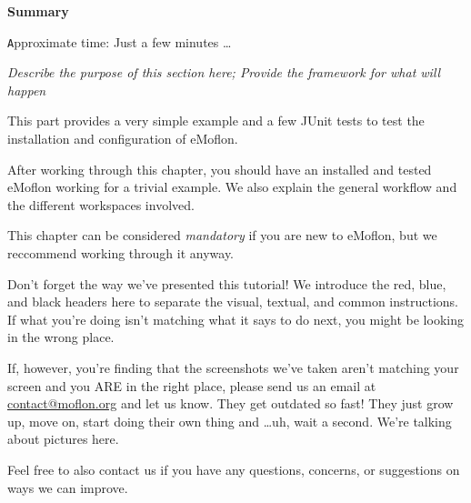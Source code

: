 \vspace*{2cm}

{\Huge \bfseries Summary}
\vspace{0.5cm}

{\small \texttt Approximate time: Just a few minutes \ldots}

\emph{Describe the purpose of this section here; Provide the framework for what will happen}

This part provides a very simple example and a few JUnit tests to test the installation and configuration of eMoflon.

After working through this chapter, you should have an installed and tested eMoflon working for a trivial example.
We also explain the general workflow and the different workspaces involved.

This chapter can be considered \emph{mandatory} if you are new to eMoflon, but we reccommend working through it anyway.

Don't forget the way we've presented this tutorial! We introduce the red, blue, and black headers here to separate the visual, textual, and common instructions. 
If what you're doing isn't matching what it says to do next, you might be looking in the wrong place.

If, however, you're finding that the screenshots we've taken aren't matching your screen and you ARE in the right place, please send us an email at \href{mailto:contact@moflon.org}{contact@moflon.org} and let us know. They get outdated so fast! They just grow up, move on, start doing their own thing and \ldots uh, wait a second. We're talking about pictures here.

Feel free to also contact us if you have any questions, concerns, or suggestions on ways we can improve.